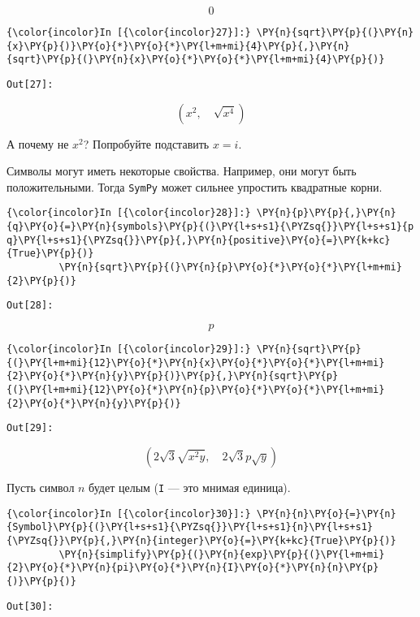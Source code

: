     \[0\]

    

    \begin{Verbatim}[commandchars=\\\{\}]
{\color{incolor}In [{\color{incolor}27}]:} \PY{n}{sqrt}\PY{p}{(}\PY{n}{x}\PY{p}{)}\PY{o}{*}\PY{o}{*}\PY{l+m+mi}{4}\PY{p}{,}\PY{n}{sqrt}\PY{p}{(}\PY{n}{x}\PY{o}{*}\PY{o}{*}\PY{l+m+mi}{4}\PY{p}{)}
\end{Verbatim}
\texttt{\color{outcolor}Out[{\color{outcolor}27}]:}
    
    \[\left ( x^{2}, \quad \sqrt{x^{4}}\right )\]

    

    А почему не \(x^2\)? Попробуйте подставить \(x=i\).

Символы могут иметь некоторые свойства. Например, они могут быть
положительными. Тогда \texttt{SymPy} может сильнее упростить квадратные
корни.

    \begin{Verbatim}[commandchars=\\\{\}]
{\color{incolor}In [{\color{incolor}28}]:} \PY{n}{p}\PY{p}{,}\PY{n}{q}\PY{o}{=}\PY{n}{symbols}\PY{p}{(}\PY{l+s+s1}{\PYZsq{}}\PY{l+s+s1}{p q}\PY{l+s+s1}{\PYZsq{}}\PY{p}{,}\PY{n}{positive}\PY{o}{=}\PY{k+kc}{True}\PY{p}{)}
         \PY{n}{sqrt}\PY{p}{(}\PY{n}{p}\PY{o}{*}\PY{o}{*}\PY{l+m+mi}{2}\PY{p}{)}
\end{Verbatim}
\texttt{\color{outcolor}Out[{\color{outcolor}28}]:}
    
    \[p\]

    

    \begin{Verbatim}[commandchars=\\\{\}]
{\color{incolor}In [{\color{incolor}29}]:} \PY{n}{sqrt}\PY{p}{(}\PY{l+m+mi}{12}\PY{o}{*}\PY{n}{x}\PY{o}{*}\PY{o}{*}\PY{l+m+mi}{2}\PY{o}{*}\PY{n}{y}\PY{p}{)}\PY{p}{,}\PY{n}{sqrt}\PY{p}{(}\PY{l+m+mi}{12}\PY{o}{*}\PY{n}{p}\PY{o}{*}\PY{o}{*}\PY{l+m+mi}{2}\PY{o}{*}\PY{n}{y}\PY{p}{)}
\end{Verbatim}
\texttt{\color{outcolor}Out[{\color{outcolor}29}]:}
    
    \[\left ( 2 \sqrt{3} \sqrt{x^{2} y}, \quad 2 \sqrt{3} p \sqrt{y}\right )\]

    

    Пусть символ \(n\) будет целым (\texttt{I} --- это мнимая единица).

    \begin{Verbatim}[commandchars=\\\{\}]
{\color{incolor}In [{\color{incolor}30}]:} \PY{n}{n}\PY{o}{=}\PY{n}{Symbol}\PY{p}{(}\PY{l+s+s1}{\PYZsq{}}\PY{l+s+s1}{n}\PY{l+s+s1}{\PYZsq{}}\PY{p}{,}\PY{n}{integer}\PY{o}{=}\PY{k+kc}{True}\PY{p}{)}
         \PY{n}{simplify}\PY{p}{(}\PY{n}{exp}\PY{p}{(}\PY{l+m+mi}{2}\PY{o}{*}\PY{n}{pi}\PY{o}{*}\PY{n}{I}\PY{o}{*}\PY{n}{n}\PY{p}{)}\PY{p}{)}
\end{Verbatim}
\texttt{\color{outcolor}Out[{\color{outcolor}30}]:}
    
